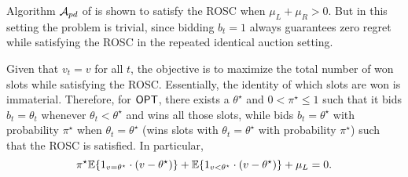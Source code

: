  \begin{rem}\label{rem:degenerate} Algorithm $\mathcal{A}_{pd}$ of \cite{Feng} is shown to satisfy the ROSC when $\mu_L + \mu_R > 0$. But in this setting the problem is trivial, since bidding $b_t=1$ always 
 guarantees zero regret while satisfying the ROSC  in the repeated identical auction setting.
 \end{rem}
 
Given that $v_t=v$ for all $t$, the objective is to maximize the total number of won slots while satisfying the ROSC. Essentially, the identity of which slots are won is immaterial. Therefore, for $\mathsf{OPT}$, there exists a $\theta^\star$ and $0<\pi^\star\le 1$ such that it bids 
$b_t = \theta_t$ whenever $\theta_t<\theta^\star$ and wins all those slots, while bids 
$b_t=\theta^\star$ with probability $\pi^\star$ when $\theta_t=\theta^\star$ (wins slots with $\theta_t=\theta^\star$ with probability $\pi^\star$) such 
that the ROSC is satisfied. In particular, 
\begin{equation}\label{defn:thetastar}
\pi^\star {\mathbb{E}}\{1_{v= \theta^\star}\cdot (v-\theta^\star)\} + {\mathbb{E}}\{1_{v< \theta^\star}\cdot (v-\theta^\star)\}+ \mu_L = 0.
\end{equation}
 

